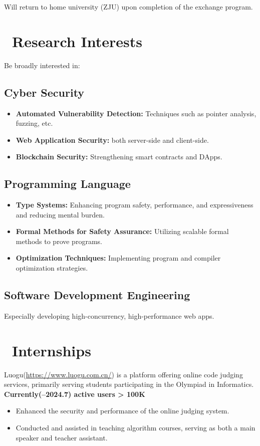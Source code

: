 \documentclass{resume}
\begin{document}
Will return to home university (ZJU) upon completion of the exchange program.

\section{\faLightbulbO\ Research Interests}
Be broadly interested in:
\subsection{Cyber Security}
\begin{itemize}
  \item \textbf{Automated Vulnerability Detection:} Techniques such as pointer analysis, fuzzing, etc.
  \item \textbf{Web Application Security:} both server-side and client-side.
  \item \textbf{Blockchain Security:} Strengthening smart contracts and DApps.
\end{itemize}

\subsection{Programming Language}
\begin{itemize}
  \item \textbf{Type Systems:} Enhancing program safety, performance, and expressiveness and reducing mental burden.
  \item \textbf{Formal Methods for Safety Assurance:} Utilizing scalable formal methods to prove programs.
  \item \textbf{Optimization Techniques:} Implementing program and compiler optimization strategies.
\end{itemize}

\subsection{Software Development Engineering}
Especially developing high-concurrency, high-performance web apps.

\section{\faUsers\ Internships}
Luogu(\url{https://www.luogu.com.cn/}) is a platform offering online code judging services, primarily serving students participating in the Olympiad in Informatics.\\
\textbf{Currently(--2024.7) active users > 100K}
\begin{itemize}
  \item Enhanced the security and performance of the online judging system.
  \item Conducted and assisted in teaching algorithm courses, serving as both a main speaker and teacher assistant.
\end{itemize}
\end{document}
